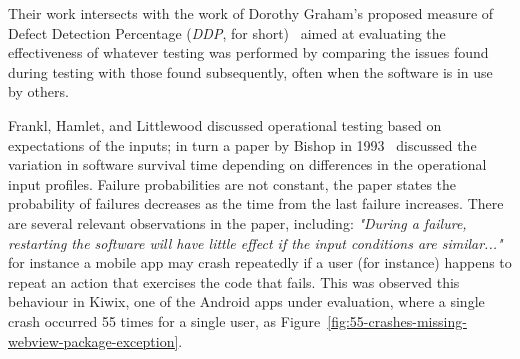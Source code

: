 Their work intersects with the work of Dorothy Graham's proposed measure of Defect Detection Percentage (\emph{DDP}, for short)~\cite{graham_measuring_2009} aimed at evaluating the effectiveness of whatever testing was performed by comparing the issues found during testing with those found subsequently, often when the software is in use by others.

Frankl, Hamlet, and Littlewood discussed operational testing based on expectations of the inputs; in turn a paper by Bishop in 1993~\cite{bishop1993variation} discussed the variation in software survival time depending on differences in the operational input profiles. Failure probabilities are not constant, the paper states the probability of failures decreases as the time from the last failure increases. There are several relevant observations in the paper, including: \emph{"During a failure, restarting the software will have little effect if the input conditions are similar..."} for instance a mobile app may crash repeatedly if a user (for instance) happens to repeat an action that exercises the code that fails. This was observed this behaviour in Kiwix, one of the Android apps under evaluation, where a single crash occurred 55 times for a single user, as Figure~\ref{fig:55-crashes-missing-webview-package-exception}.

